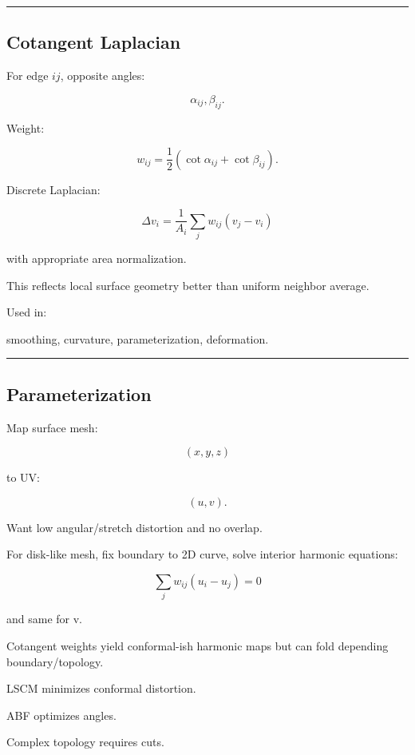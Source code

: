 \begin{center}\rule{0.5\linewidth}{0.5pt}\end{center}

\subsection{Cotangent Laplacian}\label{04-visual-computing-ii-ch041-cotangent-laplacian}

For edge \(ij\), opposite angles:

\[
\alpha_{ij},\beta_{ij}.
\]

Weight:

\[
\boxed{
w_{ij}
=
\frac12
(
\cot\alpha_{ij}
+
\cot\beta_{ij}
).
}
\]

Discrete Laplacian:

\[
\Delta v_i
=
\frac1{A_i}
\sum_{j}
w_{ij}(v_j-v_i)
\]

with appropriate area normalization.

This reflects local surface geometry better than uniform neighbor average.

Used in:

smoothing, curvature, parameterization, deformation.

\begin{center}\rule{0.5\linewidth}{0.5pt}\end{center}

\subsection{Parameterization}\label{04-visual-computing-ii-ch041-parameterization}

Map surface mesh:

\[
(x,y,z)
\]

to UV:

\[
(u,v).
\]

Want low angular/stretch distortion and no overlap.

For disk-like mesh, fix boundary to 2D curve, solve interior harmonic equations:

\[
\boxed{
\sum_j
w_{ij}
(u_i-u_j)=0
}
\]

and same for v.

Cotangent weights yield conformal-ish harmonic maps but can fold depending boundary/topology.

LSCM minimizes conformal distortion.

ABF optimizes angles.

Complex topology requires cuts.

